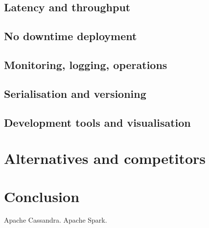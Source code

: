 \documentclass[a4paper, 10 pt, conference]{IEEEtran}
\begin{document}
\subsection{Latency and throughput}
\subsection{No downtime deployment}
\subsection{Monitoring, logging, operations}
\subsection{Serialisation and versioning}
\subsection{Development tools and visualisation}

\section{Alternatives and competitors}

\section{Conclusion}


\addtolength{\textheight}{-12cm}  %

\begin{thebibliography}{99}
 Apache Cassandra.
 Apache Spark.
\end{thebibliography}
\end{document}
